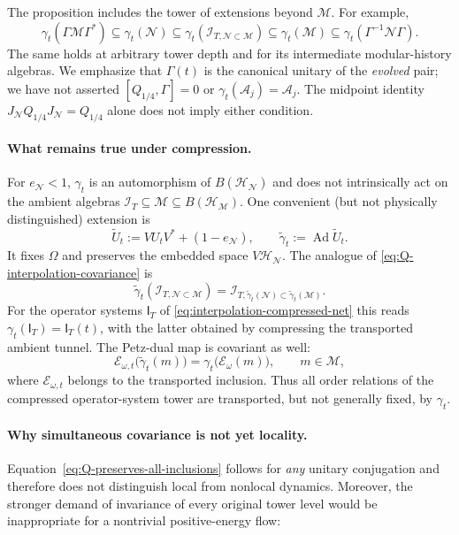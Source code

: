 \documentclass[a4paper,11pt]{article}
\theoremstyle{definition}
\newcommand{\mA}{\mathcal{A}}
\newcommand{\mN}{\mathcal{N}}
\newcommand{\mI}{\mathcal{I}}
\newcommand{\mH}{\mathcal{H}}
\newcommand{\mM}{\mathcal{M}}
\newcommand{\mE}{\mathcal{E}}
\begin{document}
The proposition includes the tower of extensions beyond $\mM$.
For example,
\begin{equation}
 \gamma_t(\Gamma\mM\Gamma^*)
 \subseteq\gamma_t(\mN)
 \subseteq\gamma_t(\mI_{T,\mN\subset\mM})
 \subseteq\gamma_t(\mM)
 \subseteq\gamma_t(\Gamma^{-1}\mN\Gamma).
 \label{eq:Q-extension-chain-covariance}
\end{equation}
The same holds at arbitrary tower depth and for its intermediate
modular-history algebras. We emphasize that $\Gamma(t)$ is the
canonical unitary of the \emph{evolved} pair; we have not asserted
$[Q_{1/4},\Gamma]=0$ or
$\gamma_t(\mA_j)=\mA_j$. The midpoint identity
$J_{\mN}Q_{1/4}J_{\mN}=Q_{1/4}$ alone does not imply either condition.

\paragraph{What remains true under compression.}
For $e_\mN<1$, $\gamma_t$ is an automorphism of
$B(\mH_\mN)$ and does not intrinsically act on the ambient
algebras $\mI_T\subseteq\mM\subseteq B(\mH_\mM)$.
One convenient (but not physically distinguished) extension is
\begin{equation}
 \widetilde U_t:=VU_tV^*+(1-e_\mN),
 \qquad \widetilde\gamma_t:=\operatorname{Ad}\widetilde U_t.
 \label{eq:Q-ambient-extended-flow}
\end{equation}
It fixes $\Omega$ and preserves the embedded space $V\mH_\mN$.
The analogue of \eqref{eq:Q-interpolation-covariance} is
\begin{equation}
 \widetilde\gamma_t(\mI_{T,\mN\subset\mM})
 =\mI_{T,\widetilde\gamma_t(\mN)\subset
              \widetilde\gamma_t(\mM)}.
 \label{eq:Q-compressed-tunnel-transport}
\end{equation}
For the operator systems $\mathsf I_T$ of
\eqref{eq:interpolation-compressed-net} this reads
$\gamma_t(\mathsf I_T)=\mathsf I_T(t)$, with the latter obtained
by compressing the transported ambient tunnel. The Petz-dual map
is covariant as well:
\begin{equation}
 \mE_{\omega,t}\bigl(\widetilde\gamma_t(m)\bigr)
 =\gamma_t\bigl(\mE_\omega(m)\bigr),
 \qquad m\in\mM,
 \label{eq:Q-Petz-covariance}
\end{equation}
where $\mE_{\omega,t}$ belongs to the transported inclusion.
Thus all order relations of the compressed operator-system tower
are transported, but not generally fixed, by $\gamma_t$.

\paragraph{Why simultaneous covariance is not yet locality.}
Equation~\eqref{eq:Q-preserves-all-inclusions} follows for
\emph{any} unitary conjugation and therefore does not distinguish
local from nonlocal dynamics. Moreover, the stronger demand of
invariance of every original tower level would be inappropriate
for a nontrivial positive-energy flow:
\end{document}
